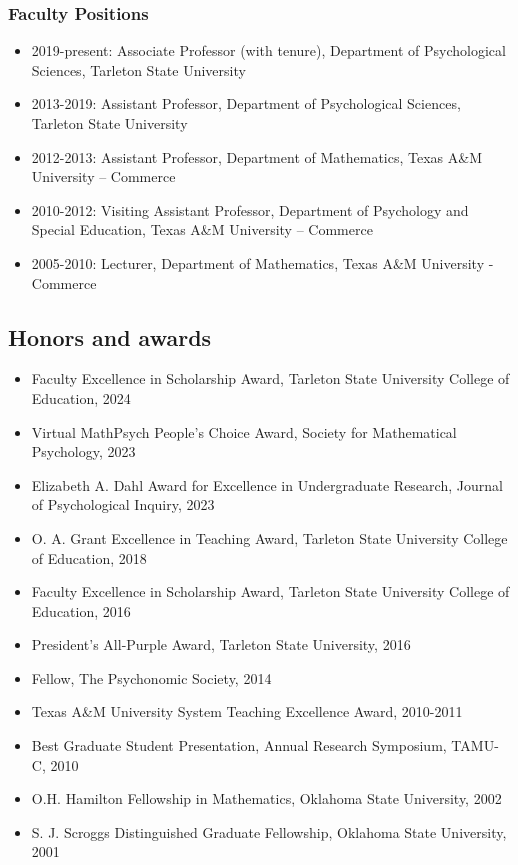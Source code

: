 \documentclass[article,10pt]{article}
\begin{document}
\subsubsection*{Faculty Positions}
\label{sec:org7f5ddcd}
\begin{itemize}
\item 2019-present: Associate Professor (with tenure), Department of Psychological Sciences, Tarleton State University
\item 2013-2019: Assistant Professor, Department of Psychological Sciences, Tarleton State University
\item 2012-2013: Assistant Professor, Department of Mathematics, Texas A\&M University – Commerce
\item 2010-2012: Visiting Assistant Professor, Department of Psychology and Special Education, Texas A\&M University – Commerce
\item 2005-2010: Lecturer, Department of Mathematics, Texas A\&M University - Commerce
\end{itemize}

\subsection*{Honors and awards}
\label{sec:org46c5441}
\begin{itemize}
\item Faculty Excellence in Scholarship Award, Tarleton State University College of Education, 2024
\item Virtual MathPsych People's Choice Award, Society for Mathematical Psychology, 2023
\item Elizabeth A. Dahl Award for Excellence in Undergraduate Research, Journal of Psychological Inquiry, 2023
\item O. A. Grant Excellence in Teaching Award, Tarleton State University College of Education, 2018
\item Faculty Excellence in Scholarship Award, Tarleton State University College of Education, 2016
\item President's All-Purple Award, Tarleton State University, 2016
\item Fellow, The Psychonomic Society, 2014
\item Texas A\&M University System Teaching Excellence Award, 2010-2011
\item Best Graduate Student Presentation, Annual Research Symposium, TAMU-C, 2010
\item O.H. Hamilton Fellowship in Mathematics, Oklahoma State University, 2002
\item S. J. Scroggs Distinguished Graduate Fellowship, Oklahoma State University, 2001
\end{itemize}
\end{document}
